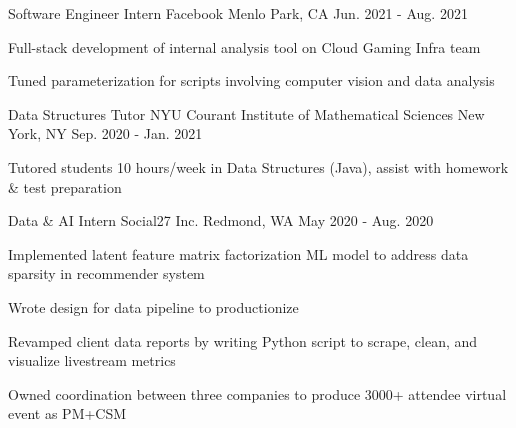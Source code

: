 

\begin{cventries}

  \cventry
    {Software Engineer Intern} %
    {Facebook} %
    {Menlo Park, CA} %
    {Jun. 2021 - Aug. 2021} %
    {
      \begin{cvitems} %
        \item {Full-stack development of internal analysis tool on Cloud Gaming Infra team}
        \item {Tuned parameterization for scripts involving computer vision and data analysis}
      \end{cvitems}
    }

    \cventry
    {Data Structures Tutor} %
    {NYU Courant Institute of Mathematical Sciences} %
    {New York, NY} %
    {Sep. 2020 - Jan. 2021} %
    {
      \begin{cvitems} %
        \item {Tutored students 10 hours/week in Data Structures (Java), assist with homework \& test preparation}
      \end{cvitems}
    }

  \cventry
    {Data \& AI Intern} %
    {Social27 Inc.} %
    {Redmond, WA} %
    {May 2020 - Aug. 2020} %
    {
      \begin{cvitems} %
        \item {Implemented latent feature matrix factorization ML model to address data sparsity in recommender system}
        \item {Wrote design for data pipeline to productionize}
        \item {Revamped client data reports by writing Python script to scrape, clean, and visualize livestream metrics}
        \item {Owned coordination between three companies to produce 3000+ attendee virtual event as PM+CSM}
      \end{cvitems}
    }


\end{cventries}
